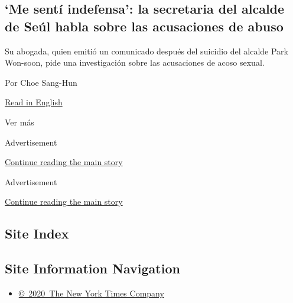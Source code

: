 \begin{enumerate}
  \hypertarget{me-sentuxed-indefensa-la-secretaria-del-alcalde-de-seuxfal-habla-sobre-las-acusaciones-de-abuso}{%
  \subsection{`Me sentí indefensa': la secretaria del alcalde de Seúl
  habla sobre las acusaciones de
  abuso}\label{me-sentuxed-indefensa-la-secretaria-del-alcalde-de-seuxfal-habla-sobre-las-acusaciones-de-abuso}}

  Su abogada, quien emitió un comunicado después del suicidio del
  alcalde Park Won-soon, pide una investigación sobre las acusaciones de
  acoso sexual.

  Por Choe Sang-Hun

  \href{https://www.nytimes3xbfgragh.onion/2020/07/13/world/asia/seoul-mayor-sexual-harassment.html}{Read
  in English}
\end{enumerate}

Ver más

Advertisement

\protect\hyperlink{after-mid2}{Continue reading the main story}

Advertisement

\protect\hyperlink{after-mktg}{Continue reading the main story}

\hypertarget{site-index}{%
\subsection{Site Index}\label{site-index}}

\hypertarget{site-information-navigation}{%
\subsection{Site Information
Navigation}\label{site-information-navigation}}

\begin{itemize}
\tightlist
\item
  \href{https://help.nytimes3xbfgragh.onion/hc/en-us/articles/115014792127-Copyright-notice}{©~2020~The
  New York Times Company}
\end{itemize}


